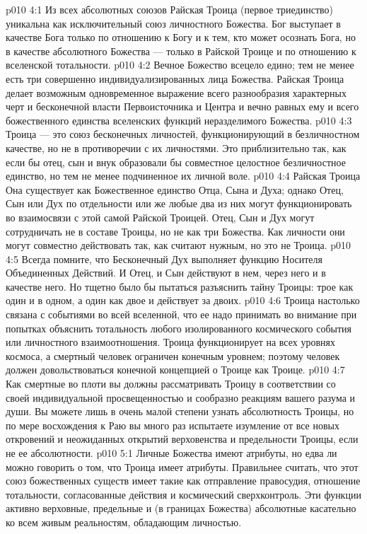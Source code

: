 \vs p010 4:1 Из всех абсолютных союзов Райская Троица (первое триединство) уникальна как исключительный союз личностного Божества. Бог выступает в качестве Бога только по отношению к Богу и к тем, кто может осознать Бога, но в качестве абсолютного Божества --- только в Райской Троице и по отношению к вселенской тотальности.
\vs p010 4:2 \pc Вечное Божество всецело едино; тем не менее есть три совершенно индивидуализированных лица Божества. Райская Троица делает возможным одновременное выражение всего разнообразия характерных черт и бесконечной власти Первоисточника и Центра и вечно равных ему и всего божественного единства вселенских функций неразделимого Божества.
\vs p010 4:3 Троица --- это союз бесконечных личностей, функционирующий в безличностном качестве, но не в противоречии с их личностями. Это приблизительно так, как если бы отец, сын и внук образовали бы совместное целостное безличностное единство, но тем не менее подчиненное их личной воле.
\vs p010 4:4 Райская Троица  Она существует как Божественное единство Отца, Сына и Духа; однако Отец, Сын или Дух по отдельности или же любые два из них могут функционировать во взаимосвязи с этой самой Райской Троицей. Отец, Сын и Дух могут сотрудничать не в составе Троицы, но не как три Божества. Как личности они могут совместно действовать так, как считают нужным, но это не Троица.
\vs p010 4:5 \pc Всегда помните, что Бесконечный Дух выполняет функцию Носителя Объединенных Действий. И Отец, и Сын действуют в нем, через него и в качестве него. Но тщетно было бы пытаться разъяснить тайну Троицы: трое как один и в одном, а один как двое и действует за двоих.
\vs p010 4:6 \pc Троица настолько связана с событиями во всей вселенной, что ее надо принимать во внимание при попытках объяснить тотальность любого изолированного космического события или личностного взаимоотношения. Троица функционирует на всех уровнях космоса, а смертный человек ограничен конечным уровнем; поэтому человек должен довольствоваться конечной концепцией о Троице как Троице.
\vs p010 4:7 Как смертные во плоти вы должны рассматривать Троицу в соответствии со своей индивидуальной просвещенностью и сообразно реакциям вашего разума и души. Вы можете лишь в очень малой степени узнать абсолютность Троицы, но по мере восхождения к Раю вы много раз испытаете изумление от все новых откровений и неожиданных открытий верховенства и предельности Троицы, если не ее абсолютности.
\vs p010 5:1 Личные Божества имеют атрибуты, но едва ли можно говорить о том, что Троица имеет атрибуты. Правильнее считать, что этот союз божественных существ имеет такие  как отправление правосудия, отношение тотальности, согласованные действия и космический сверхконтроль. Эти функции активно верховные, предельные и (в границах Божества) абсолютные касательно ко всем живым реальностям, обладающим личностью.
